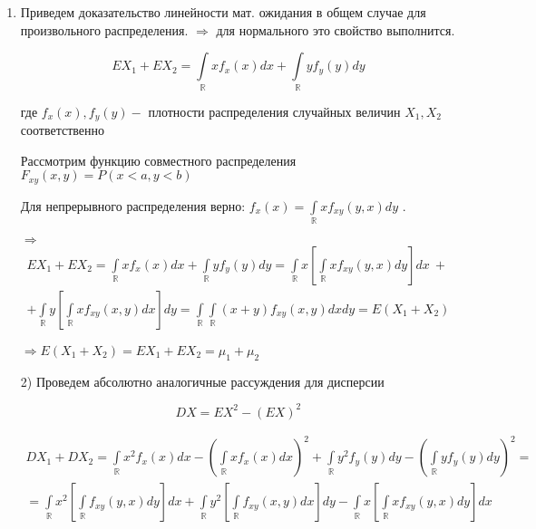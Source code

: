 \documentclass[a4paper,12pt]{article}
\begin{document}
\begin{enumerate}

\item
Приведем доказательство линейности мат. ожидания в общем случае для произвольного распределения. $\Rightarrow$ для нормального это свойство выполнится.

$$EX_1 + EX_2 = \int\limits_\mathbb{R} xf_x(x)dx + \int\limits_\mathbb{R} yf_y(y)dy$$

где $f_x(x), f_y(y) -$ плотности распределения случайных величин $X_1, X_2$ соответственно

Рассмотрим функцию совместного распределения $F_{xy}(x,y) = P(x<a, y<b)$

Для непрерывного распределения верно: $f_x(x) = \int\limits_\mathbb{R} xf_{xy}(y, x)dy$ .

\item[$\Longrightarrow$]  
\begin{multline*}
EX_1+EX_2 = \int\limits_\mathbb{R} xf_x(x)dx + \int\limits_\mathbb{R} yf_y(y)dy = \int\limits_\mathbb{R} x \left[\int\limits_\mathbb{R} xf_{xy}(y, x)dy \right]dx \ +\\
+ \int\limits_\mathbb{R} y \left[\int\limits_\mathbb{R} xf_{xy}(x, y)dx \right]dy =  \int\limits_\mathbb{R}\int\limits_\mathbb{R} (x+y) f_{xy}(x, y)dxdy = E(X_1+X_2) 
\end{multline*}

$\Longrightarrow E(X_1+X_2) = EX_1 + EX_2 = \mu_1 +\mu_2$\\

\item[2)] Проведем абсолютно аналогичные рассуждения для дисперсии

\[ DX = EX^2 - (EX)^2 \]

\begin{multline*}
DX_1+DX_2 = \int\limits_\mathbb{R} x^2f_x(x)dx -\left(\int\limits_\mathbb{R} xf_x(x)dx\right)^2 + \int\limits_\mathbb{R} y^2f_y(y)dy -\left(\int\limits_\mathbb{R} yf_y(y)dy\right)^2 =\\
= \int\limits_\mathbb{R} x^2 \left[\int\limits_\mathbb{R} f_{xy}(y, x)dy \right]dx + \int\limits_\mathbb{R} y^2 \left[\int\limits_\mathbb{R} f_{xy}(x, y)dx \right]dy  - \int\limits_\mathbb{R} x \left[\int\limits_\mathbb{R} xf_{xy}(y, x)dy \right]dx
\end{multline*}

\end{enumerate}


\section{}
\end{document}
